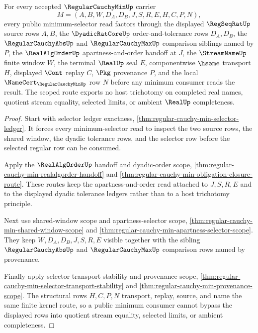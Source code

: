 \begin{theorem}
\label{thm:regular-cauchy-min-kernel-scope-route}
For every accepted $\RegularCauchyMinUp$ carrier
$$
M=(A,B,W,D_A,D_B,J,S,R,E,H,C,P,N),
$$
every public minimum-selector read factors through the displayed $\RegSeqRatUp$ source rows $A,B$, the $\DyadicRatCoreUp$ order-and-tolerance rows $D_A,D_B$, the $\RegularCauchyAbsUp$ and $\RegularCauchyMaxUp$ comparison siblings named by $P$, the $\RealAlgOrderUp$ apartness-and-order handoff at $J$, the $\StreamNameUp$ finite window $W$, the terminal $\RealUp$ seal $E$, componentwise $\hsame$ transport $H$, displayed $\Cont$ replay $C$, $\Pkg$ provenance $P$, and the local $\NameCert_{\RegularCauchyMinUp}$ row $N$ before any minimum consumer reads the result. The scoped route exports no host trichotomy on completed real names, quotient stream equality, selected limits, or ambient $\RealUp$ completeness.
\end{theorem}
\begin{proof}
Start with selector ledger exactness, \autoref{thm:regular-cauchy-min-selector-ledger}. It forces every minimum-selector read to inspect the two source rows, the shared window, the dyadic tolerance rows, and the selector row before the selected regular row can be consumed.

Apply the $\RealAlgOrderUp$ handoff and dyadic-order scope, \autoref{thm:regular-cauchy-min-realalgorder-handoff} and \autoref{thm:regular-cauchy-min-obligation-closure-route}. These routes keep the apartness-and-order read attached to $J,S,R,E$ and to the displayed dyadic tolerance ledgers rather than to a host trichotomy principle.

Next use shared-window scope and apartness-selector scope, \autoref{thm:regular-cauchy-min-shared-window-scope} and \autoref{thm:regular-cauchy-min-apartness-selector-scope}. They keep $W,D_A,D_B,J,S,R,E$ visible together with the sibling $\RegularCauchyAbsUp$ and $\RegularCauchyMaxUp$ comparison rows named by provenance.

Finally apply selector transport stability and provenance scope, \autoref{thm:regular-cauchy-min-selector-transport-stability} and \autoref{thm:regular-cauchy-min-provenance-scope}. The structural rows $H,C,P,N$ transport, replay, source, and name the same finite kernel route, so a public minimum consumer cannot bypass the displayed rows into quotient stream equality, selected limits, or ambient completeness.
\end{proof}

